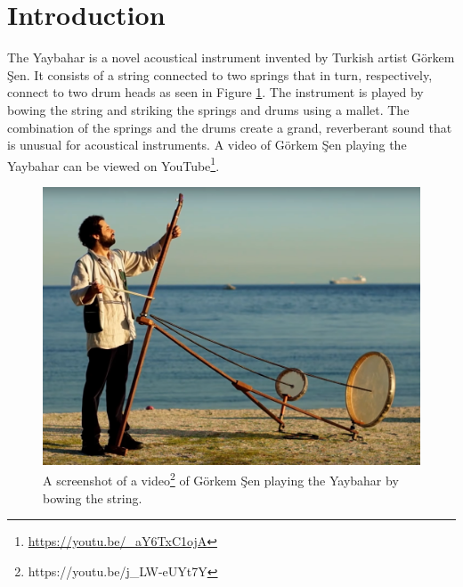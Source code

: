 \documentclass{article}
\title{\papertitle}
\begin{document}
%
\capstartfalse
\maketitle
\capstarttrue
%
\begin{abstract}
Much work has been done on the theoretical aspects of physical modeling for sound synthesis and lots of models exist that can be combined to form larger acoustical systems.
In this paper, I use those results to model a specific instrument, the Yaybahar, invented by Turkish artist Görkem Şen.
Each part of the instrument is covered independently and their physical behaviour is explained in an intuitive manner.
I then show how each model can be solved numerically using finite difference schemes (FDSs), which are reviewed briefly.
The models are implemented in C++ to form an interactive, real-time application, whose architecture and optimization is also discussed.
\end{abstract}
%

\section{Introduction}\label{sec:introduction}
\nocite{Someone:00}

The Yaybahar is a novel acoustical instrument invented by Turkish artist Görkem Şen.
It consists of a string connected to two springs that in turn, respectively, connect to two drum heads as seen in Figure \ref{fig:yaybahar}.
The instrument is played by bowing the string and striking the springs and drums using a mallet.
The combination of the springs and the drums create a grand, reverberant sound that is unusual for acoustical instruments.
A video of Görkem Şen playing the Yaybahar can be viewed on YouTube\footnote{\url{https://youtu.be/_aY6TxC1ojA}}.

\begin{figure}[h]
    \centering
    \includegraphics[width=\linewidth]{yaybahar.png}
    \caption{A screenshot of a video\footnote{https://youtu.be/j_LW-eUYt7Y} of Görkem Şen playing the Yaybahar by bowing the string.}
    \label{fig:yaybahar}
\end{figure}
\end{document}

